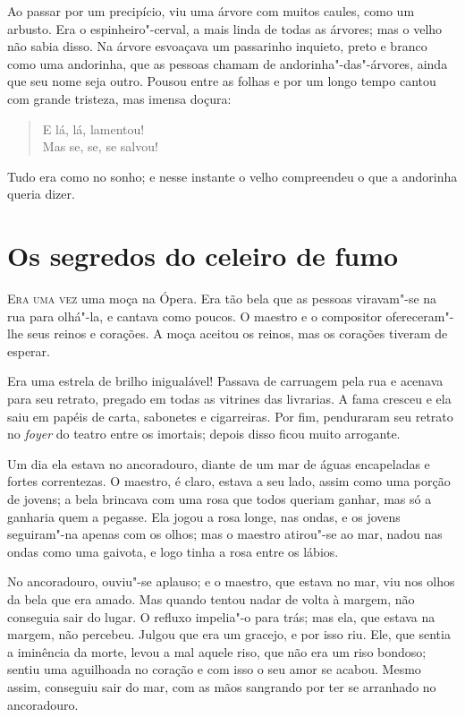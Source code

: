 Ao passar por um precipício, viu uma árvore com muitos caules, como um
arbusto. Era o espinheiro"-cerval, a mais linda de todas as árvores;
mas o velho não sabia disso. Na árvore esvoaçava um passarinho
inquieto, preto e branco como uma andorinha, que as pessoas chamam de
andorinha"-das"-árvores, ainda que seu nome seja outro. Pousou entre
as folhas e por um longo tempo cantou com grande tristeza, mas imensa
doçura:
\begin{verse}
E lá, lá, lamentou!\\
Mas se, se, se salvou!
\end{verse}

Tudo era como no sonho; e nesse instante o velho compreendeu o que a
andorinha queria dizer.

\chapter[Os segredos do celeiro de fumo]{Os segredos do celeiro de fumo}


\textsc{Era uma vez} uma moça na Ópera. Era tão bela que as pessoas viravam"-se
na rua para olhá"-la, e cantava como poucos. O maestro e o compositor
ofereceram"-lhe seus reinos e corações. A moça aceitou os reinos, mas
os corações tiveram de esperar.

Era uma estrela de brilho inigualável! Passava de carruagem pela rua e
acenava para seu retrato, pregado em todas as vitrines das livrarias. A
fama cresceu e ela saiu em papéis de carta, sabonetes e cigarreiras.
Por fim, penduraram seu retrato no \textit{foyer} do teatro entre os
imortais; depois disso ficou muito arrogante.

Um dia ela estava no ancoradouro, diante de um mar de águas encapeladas
e fortes correntezas. O maestro, é claro, estava a seu lado, assim como
uma porção de jovens; a bela brincava com uma rosa que todos queriam
ganhar, mas só a ganharia quem a pegasse. Ela jogou a rosa longe, nas
ondas, e os jovens seguiram"-na apenas com os olhos; mas o maestro
atirou"-se ao mar, nadou nas ondas como uma gaivota, e logo tinha a
rosa entre os lábios.

No ancoradouro, ouviu"-se aplauso; e o maestro, que estava no mar, viu
nos olhos da bela que era amado. Mas quando tentou nadar de volta à
margem, não conseguia sair do lugar. O refluxo impelia"-o para trás;
mas ela, que estava na margem, não percebeu. Julgou que era um gracejo,
e por isso riu. Ele, que sentia a iminência da morte, levou a mal
aquele riso, que não era um riso bondoso; sentiu uma aguilhoada no
coração e com isso o seu amor se acabou. Mesmo assim, conseguiu sair do
mar, com as mãos sangrando por ter se arranhado no ancoradouro.

